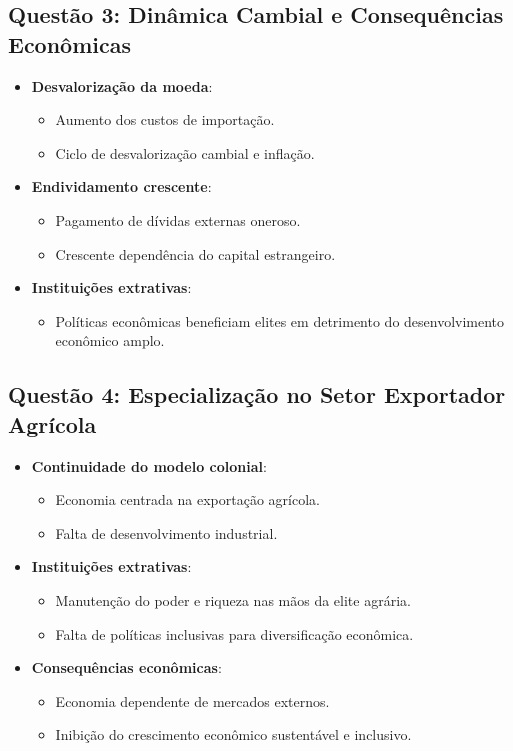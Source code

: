 \documentclass[a4paper,12pt]{article}[abntex2]
\begin{document}
\subsection{\textbf{Questão 3: Dinâmica Cambial e Consequências Econômicas}}

\begin{itemize}
    \item \textbf{Desvalorização da moeda}:
    \begin{itemize}
        \item Aumento dos custos de importação.
        \item Ciclo de desvalorização cambial e inflação.
    \end{itemize}
    \item \textbf{Endividamento crescente}:
    \begin{itemize}
        \item Pagamento de dívidas externas oneroso.
        \item Crescente dependência do capital estrangeiro.
    \end{itemize}
    \item \textbf{Instituições extrativas}:
    \begin{itemize}
        \item Políticas econômicas beneficiam elites em detrimento do desenvolvimento econômico amplo.
    \end{itemize}
\end{itemize}

\subsection{\textbf{Questão 4: Especialização no Setor Exportador Agrícola}}

\begin{itemize}
    \item \textbf{Continuidade do modelo colonial}:
    \begin{itemize}
        \item Economia centrada na exportação agrícola.
        \item Falta de desenvolvimento industrial.
    \end{itemize}
    \item \textbf{Instituições extrativas}:
    \begin{itemize}
        \item Manutenção do poder e riqueza nas mãos da elite agrária.
        \item Falta de políticas inclusivas para diversificação econômica.
    \end{itemize}
    \item \textbf{Consequências econômicas}:
    \begin{itemize}
        \item Economia dependente de mercados externos.
        \item Inibição do crescimento econômico sustentável e inclusivo.
    \end{itemize}
\end{itemize}
\end{document}
